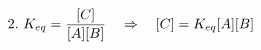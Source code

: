 \documentclass[preview]{standalone}
\begin{document}
\begin{align*}
\special{dvisvgm:raw <g id='unique000'>}2.\ K_{eq} = \frac{[C]}{[A][B]} \quad \Rightarrow \quad [C] = K_{eq}[A][B]\special{dvisvgm:raw </g>}
\end{align*}
\end{document}
